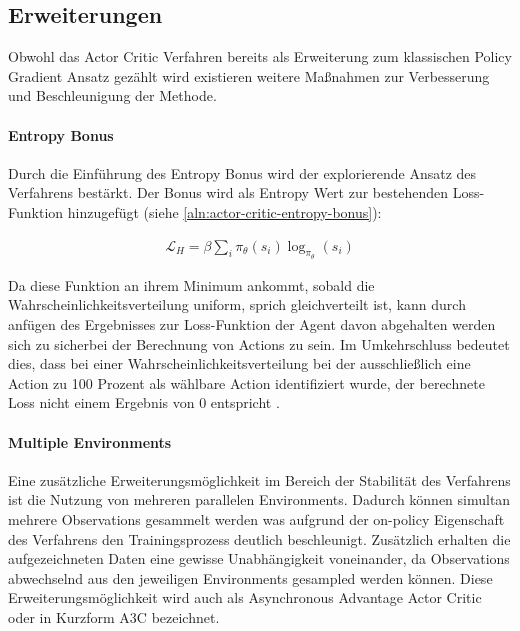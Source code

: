 \documentclass[11pt]{scrartcl}
\begin{document}
\subsection{Erweiterungen}
Obwohl das Actor Critic Verfahren bereits als Erweiterung zum klassischen Policy Gradient Ansatz
gezählt wird existieren weitere Maßnahmen zur Verbesserung und Beschleunigung der Methode.

\paragraph*{Entropy Bonus} 
\noindent
\newline
Durch die Einführung des Entropy Bonus wird der explorierende Ansatz des Verfahrens bestärkt.
Der Bonus wird als Entropy Wert zur bestehenden Loss-Funktion hinzugefügt (siehe
\ref{aln:actor-critic-entropy-bonus}):

\begin{align}
\mathcal{L}_H=\beta\sum_i\pi_\theta(s_i)\log_{\pi_\theta}(s_i)
\label{aln:actor-critic-entropy-bonus}
\end{align}

Da diese Funktion an ihrem Minimum ankommt, sobald die Wahrscheinlichkeitsverteilung uniform,
sprich gleichverteilt ist, kann durch anfügen des Ergebnisses zur Loss-Funktion der Agent davon
abgehalten werden sich \grqq zu sicher\grqq bei der Berechnung von Actions zu sein. Im
Umkehrschluss bedeutet dies, dass bei einer Wahrscheinlichkeitsverteilung bei der ausschließlich
eine Action zu 100 Prozent als wählbare Action identifiziert wurde, der berechnete Loss nicht
einem Ergebnis von 0 entspricht \cite[~S.269 f.]{L2018}.

\paragraph*{Multiple Environments} 
\noindent
\newline
Eine zusätzliche Erweiterungsmöglichkeit im Bereich der Stabilität des Verfahrens ist die Nutzung
von mehreren parallelen Environments. Dadurch können simultan mehrere Observations gesammelt werden
was aufgrund der on-policy Eigenschaft des Verfahrens den Trainingsprozess deutlich beschleunigt.
Zusätzlich erhalten die aufgezeichneten Daten eine gewisse Unabhängigkeit voneinander, da Observations
abwechselnd aus den jeweiligen Environments gesampled werden können. Diese Erweiterungsmöglichkeit wird
auch als Asynchronous Advantage Actor Critic oder in Kurzform A3C bezeichnet.
\end{document}

